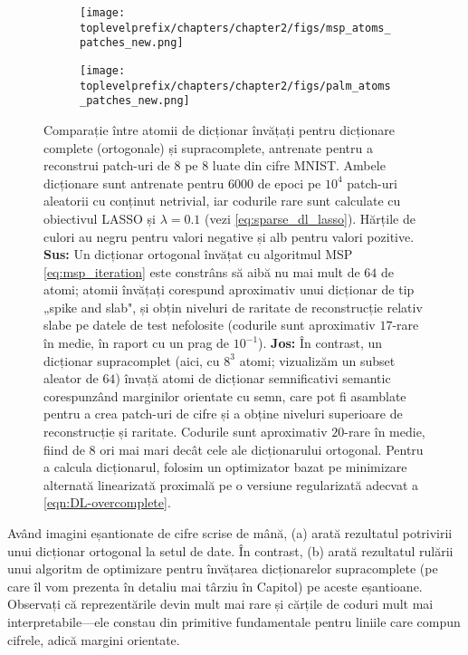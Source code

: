 \documentclass[../../book-main_ro.tex]{subfiles}
\begin{document}
\begin{figure}[t]
\centering
    \begin{subfigure}{0.9\linewidth}
        \centering
        \texttt{[image: \\toplevelprefix/chapters/chapter2/figs/msp\_atoms\_patches\_new.png]}
        \caption{}
    \end{subfigure}
    \begin{subfigure}{0.9\linewidth}
        \centering
        \texttt{[image: \\toplevelprefix/chapters/chapter2/figs/palm\_atoms\_patches\_new.png]}
        \caption{}
    \end{subfigure}
    \caption{Comparație între atomii de dicționar învățați pentru dicționare complete (ortogonale)
    și supracomplete, antrenate pentru a reconstrui patch-uri de $8$ pe $8$ luate din
    cifre MNIST. Ambele dicționare sunt antrenate pentru $6000$ de epoci pe $10^4$ patch-uri aleatorii cu
    conținut netrivial, iar codurile rare sunt calculate cu obiectivul LASSO
    și $\lambda=0.1$ (vezi \eqref{eq:sparse_dl_lasso}). Hărțile de culori au negru pentru valori negative și alb pentru
    valori pozitive. \textbf{Sus:} Un dicționar ortogonal învățat cu
    algoritmul MSP \eqref{eq:msp_iteration} este constrâns să
    aibă nu mai mult de $64$ de atomi; atomii învățați corespund aproximativ unui
    dicționar de tip „spike and slab", și obțin niveluri de raritate de reconstrucție
    relativ slabe pe datele de test nefolosite (codurile sunt aproximativ $17$-rare în
    medie, în raport cu un prag de $10^{-1}$).
    \textbf{Jos:} În contrast, un dicționar supracomplet (aici, cu $8^3$
    atomi; vizualizăm un subset aleator de $64$) învață
    atomi de dicționar semnificativi semantic corespunzând marginilor orientate
    cu semn, care pot fi asamblate pentru a crea patch-uri de cifre și a obține
    niveluri superioare de reconstrucție și raritate. Codurile sunt aproximativ
    $20$-rare în
    medie, fiind de $8$ ori mai mari decât cele ale dicționarului
    ortogonal. Pentru a calcula
    dicționarul, folosim un optimizator bazat pe minimizare alternată linearizată
    proximală pe o versiune regularizată adecvat a
    \eqref{eqn:DL-overcomplete}.}
    \label{fig:ReconMNIST}
\end{figure}

\begin{example}
Având imagini eșantionate de cifre scrise de mână, (a) arată rezultatul potrivirii unui dicționar ortogonal la setul de date.
În contrast, (b) arată rezultatul rulării unui
algoritm de optimizare pentru învățarea dicționarelor supracomplete (pe care îl vom
prezenta în detaliu mai târziu în Capitol) pe aceste eșantioane.
Observați că reprezentările devin mult mai rare și cărțile de coduri mult mai interpretabile---ele constau din primitive fundamentale pentru liniile care compun cifrele, adică margini orientate.
\end{example}
\end{document}
